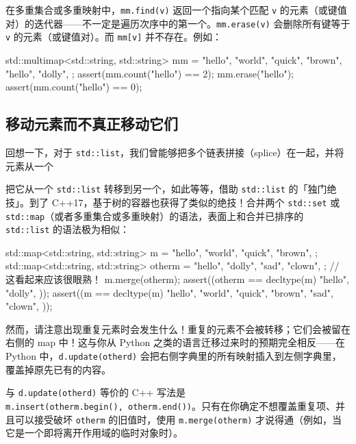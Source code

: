 在多重集合或多重映射中，\texttt{mm.\allowbreak{}find(\allowbreak{}v)\allowbreak{}} 返回一个指向某个匹配 \texttt{v} 的元素（或键值对）的迭代器——不一定是遍历次序中的第一个。\texttt{mm.\allowbreak{}erase(\allowbreak{}v)\allowbreak{}} 会删除所有键等于 \texttt{v} 的元素（或键值对）。而 \texttt{mm[v]} 并不存在。例如：

\begin{codebox}[cpp]
    std::multimap<std::string, std::string> mm = {
      {"hello", "world"},
      {"quick", "brown"},
      {"hello", "dolly"},
    };
    assert(mm.count("hello") == 2);
    mm.erase("hello");
    assert(mm.count("hello") == 0);
\end{codebox}

\subsection{移动元素而不真正移动它们}

回想一下，对于 \texttt{std::\allowbreak{}list}，我们曾能够把多个链表拼接（splice）在一起，并将元素从一个

把它从一个 \texttt{std::\allowbreak{}list} 转移到另一个，如此等等，借助 \texttt{std::\allowbreak{}list} 的「独门绝技」。到了 C++17，基于树的容器也获得了类似的绝技！合并两个 \texttt{std::\allowbreak{}set} 或 \texttt{std::\allowbreak{}map}（或者多重集合或多重映射）的语法，表面上和合并已排序的 \texttt{std::\allowbreak{}list} 的语法极为相似：

\begin{codebox}[cpp]
    std::map<std::string, std::string> m = {
      {"hello", "world"},
      {"quick", "brown"},
    };
    std::map<std::string, std::string> otherm = {
      {"hello", "dolly"},
      {"sad", "clown"},
    };
    // 这看起来应该很眼熟！
    m.merge(otherm);
    assert((otherm == decltype(m){
      {"hello", "dolly"},
    }));
    assert((m == decltype(m){
      {"hello", "world"},
      {"quick", "brown"},
      {"sad", "clown"},
    }));
\end{codebox}

然而，请注意出现重复元素时会发生什么！重复的元素不会被转移；它们会被留在右侧的 map 中！这与你从 Python 之类的语言迁移过来时的预期完全相反——在 Python 中，\texttt{d.\allowbreak{}update(\allowbreak{}otherd)\allowbreak{}} 会把右侧字典里的所有映射插入到左侧字典里，覆盖掉原先已有的内容。

与 \texttt{d.\allowbreak{}update(\allowbreak{}otherd)\allowbreak{}} 等价的 C++ 写法是 \texttt{m.\allowbreak{}insert(\allowbreak{}otherm.\allowbreak{}begin(\allowbreak{})\allowbreak{},\allowbreak{}\ otherm.\allowbreak{}end(\allowbreak{})\allowbreak{})\allowbreak{}}。只有在你确定不想覆盖重复项、并且可以接受破坏 \texttt{otherm} 的旧值时，使用 \texttt{m.\allowbreak{}merge(\allowbreak{}otherm)\allowbreak{}} 才说得通（例如，当它是一个即将离开作用域的临时对象时）。

